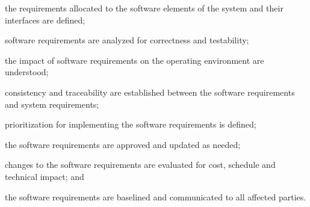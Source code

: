 			\begin{adjustwidth}{2em}{0pt} 

				\begin{compactitem}

					\item the requirements allocated to the software elements of the system and their interfaces are defined;

					\item software requirements are analyzed for correctness and testability;

					\item the impact of software requirements on the operating environment are understood;

					\item consistency and traceability are established between the software requirements and system requirements;

					\item prioritization for implementing the software requirements is defined;

					\item the software requirements are approved and updated as needed;

					\item changes to the software requirements are evaluated for cost, schedule and technical impact; and

					\item the software requirements are baselined and communicated to all affected parties.

				\end{compactitem}

			\end{adjustwidth}

